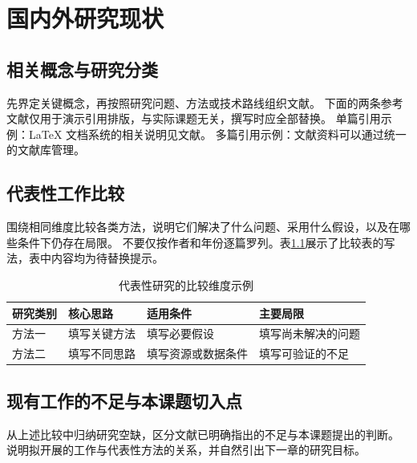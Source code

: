 \chapter{国内外研究现状}
\label{chap:literature}

\section{相关概念与研究分类}
先界定关键概念，再按照研究问题、方法或技术路线组织文献。
下面的两条参考文献仅用于演示引用排版，与实际课题无关，撰写时应全部替换。
单篇引用示例：\LaTeX{} 文档系统的相关说明见文献\cite{lamport1994}。
多篇引用示例：文献资料可以通过统一的文献库管理\cite{lamport1994,knuth1984}。

\section{代表性工作比较}
围绕相同维度比较各类方法，说明它们解决了什么问题、采用什么假设，以及在哪些条件下仍存在局限。
不要仅按作者和年份逐篇罗列。表\ref{tab:literature}展示了比较表的写法，表中内容均为待替换提示。

\begin{table}[htbp]
  \centering
  \caption{代表性研究的比较维度示例}
  \label{tab:literature}
  \begin{tabularx}{\linewidth}{@{}p{22mm}XXX@{}}
    \toprule
    研究类别 & 核心思路 & 适用条件 & 主要局限 \\
    \midrule
    方法一 & 填写关键方法 & 填写必要假设 & 填写尚未解决的问题 \\
    方法二 & 填写不同思路 & 填写资源或数据条件 & 填写可验证的不足 \\
    \bottomrule
  \end{tabularx}
\end{table}

\section{现有工作的不足与本课题切入点}
从上述比较中归纳研究空缺，区分文献已明确指出的不足与本课题提出的判断。
说明拟开展的工作与代表性方法的关系，并自然引出下一章的研究目标。
